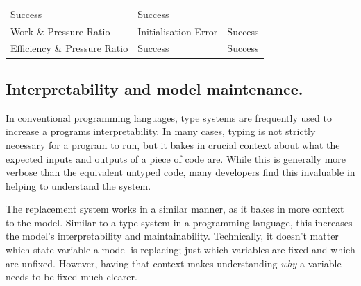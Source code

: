 \begin{longtable}[]{@{}lll@{}}
\begin{minipage}[t]{0.36\columnwidth}
Success\strut
\end{minipage} & \begin{minipage}[t]{0.37\columnwidth}\raggedright
Success\strut
\end{minipage}\tabularnewline
\begin{minipage}[t]{0.19\columnwidth}\raggedright
Work \& Pressure Ratio\strut
\end{minipage} & \begin{minipage}[t]{0.36\columnwidth}\raggedright
Initialisation Error\strut
\end{minipage} & \begin{minipage}[t]{0.37\columnwidth}\raggedright
Success\strut
\end{minipage}\tabularnewline
\begin{minipage}[t]{0.19\columnwidth}\raggedright
Efficiency \& Pressure Ratio\strut
\end{minipage} & \begin{minipage}[t]{0.36\columnwidth}\raggedright
Success\strut
\end{minipage} & \begin{minipage}[t]{0.37\columnwidth}\raggedright
Success\strut
\end{minipage}\tabularnewline
\bottomrule
\end{longtable}

\hypertarget{interpretability-and-model-maintenance.}{%
\subsection{Interpretability and model
maintenance.}\label{interpretability-and-model-maintenance.}}

In conventional programming languages, type systems are frequently used
to increase a programs interpretability. In many cases, typing is not
strictly necessary for a program to run, but it bakes in crucial context
about what the expected inputs and outputs of a piece of code are. While
this is generally more verbose than the equivalent untyped code, many
developers find this invaluable in helping to understand the system.

The replacement system works in a similar manner, as it bakes in more
context to the model. Similar to a type system in a programming
language, this increases the model's interpretability and
maintainability. Technically, it doesn't matter which state variable a
model is replacing; just which variables are fixed and which are
unfixed. However, having that context makes understanding \emph{why} a
variable needs to be fixed much clearer.

